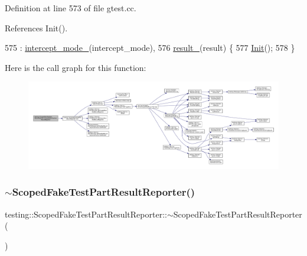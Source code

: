 Definition at line 573 of file gtest.\+cc.



References Init().


\begin{DoxyCode}
575     : \hyperlink{classtesting_1_1ScopedFakeTestPartResultReporter_ae62ed825619c11ac21fdd06480e0d982}{intercept\_mode\_}(intercept\_mode),
576       \hyperlink{classtesting_1_1ScopedFakeTestPartResultReporter_a729a26c94e4082ee0dc3312395a3f480}{result\_}(result) \{
577   \hyperlink{classtesting_1_1ScopedFakeTestPartResultReporter_a28d280a3f5d172d63b94f70b8e7660d7}{Init}();
578 \}
\end{DoxyCode}
Here is the call graph for this function\+:
\nopagebreak
\begin{figure}[H]
\begin{center}
\leavevmode
\includegraphics[width=350pt]{classtesting_1_1ScopedFakeTestPartResultReporter_a57cbc09ed48627c8a73e622618dc4b4f_cgraph}
\end{center}
\end{figure}
\mbox{\label{classtesting_1_1ScopedFakeTestPartResultReporter_a4817d59ca70228ebd5d5c3c4e8dd729d}} 
\subsubsection{\texorpdfstring{$\sim$\+Scoped\+Fake\+Test\+Part\+Result\+Reporter()}{~ScopedFakeTestPartResultReporter()}}
{\footnotesize\ttfamily testing\+::\+Scoped\+Fake\+Test\+Part\+Result\+Reporter\+::$\sim$\+Scoped\+Fake\+Test\+Part\+Result\+Reporter (\begin{DoxyParamCaption}{ }\end{DoxyParamCaption})\hspace{0.3cm}{\ttfamily [virtual]}}



